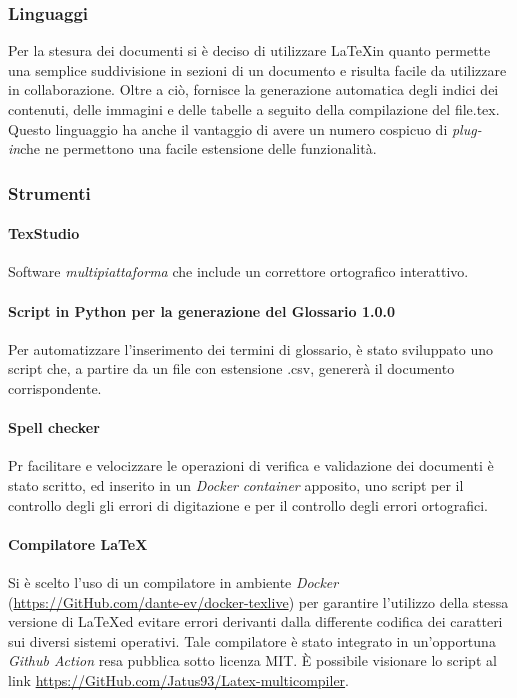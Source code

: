 \subsubsection{Linguaggi}
Per la stesura dei documenti si è deciso di utilizzare \LaTeX \space in quanto permette una semplice suddivisione in sezioni di un documento e risulta facile da utilizzare in collaborazione. Oltre a ciò, fornisce la generazione automatica degli indici dei contenuti, delle immagini e delle tabelle a seguito della compilazione del file.tex. Questo linguaggio ha anche il vantaggio di avere un numero cospicuo di \textit{plug-in}\glo che ne permettono una facile estensione delle funzionalità.

\subsubsection{Strumenti}
\paragraph{TexStudio}
Software \textit{multipiattaforma\glo} che include un correttore ortografico interattivo.

\paragraph{Script in Python per la generazione del Glossario 1.0.0\docs}
Per automatizzare l'inserimento dei termini di glossario, è stato sviluppato uno script che, a partire da un file con estensione .csv, genererà il documento corrispondente.

\paragraph{Spell checker}
Pr facilitare e velocizzare le operazioni di verifica e validazione dei documenti è
stato scritto, ed inserito in un \textit{Docker\glo} \textit{container\glo} apposito, uno script per il controllo degli gli errori di digitazione e per il controllo degli errori ortografici.

\paragraph{Compilatore \LaTeX}
Si è scelto l'uso di un compilatore in ambiente\textit{ Docker\glo} (\url{https://GitHub.com/dante-ev/docker-texlive}) per garantire l'utilizzo della stessa versione di \LaTeX ed evitare errori derivanti dalla differente codifica dei caratteri sui diversi sistemi operativi. Tale compilatore è stato integrato in un'opportuna \textit{Github Action\glo} resa pubblica sotto licenza MIT. È possibile visionare lo script al link \url{https://GitHub.com/Jatus93/Latex-multicompiler}.


